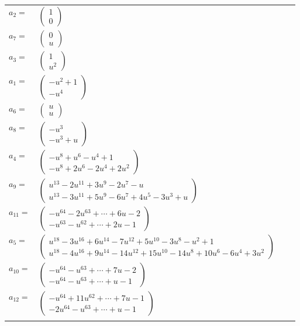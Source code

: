 \documentclass[1p]{elsarticle_modified}
\theoremstyle{definition}
\begin{document}
\begin{tabular}{m{7pt} m{180pt} m{7pt} m{180pt} }
\flushright $a_{2}=$&$\begin{pmatrix}1\\0\end{pmatrix}$ \\
\flushright $a_{7}=$&$\begin{pmatrix}0\\u\end{pmatrix}$ \\
\flushright $a_{3}=$&$\begin{pmatrix}1\\u^2\end{pmatrix}$ \\
\flushright $a_{1}=$&$\begin{pmatrix}- u^2+1\\- u^4\end{pmatrix}$ \\
\flushright $a_{6}=$&$\begin{pmatrix}u\\u\end{pmatrix}$ \\
\flushright $a_{8}=$&$\begin{pmatrix}- u^3\\- u^3+u\end{pmatrix}$ \\
\flushright $a_{4}=$&$\begin{pmatrix}- u^8+u^6- u^4+1\\- u^8+2 u^6-2 u^4+2 u^2\end{pmatrix}$ \\
\flushright $a_{9}=$&$\begin{pmatrix}u^{13}-2 u^{11}+3 u^9-2 u^7- u\\u^{13}-3 u^{11}+5 u^9-6 u^7+4 u^5-3 u^3+u\end{pmatrix}$ \\
\flushright $a_{11}=$&$\begin{pmatrix}- u^{64}-2 u^{63}+\cdots+6 u-2\\- u^{63}- u^{62}+\cdots+2 u-1\end{pmatrix}$ \\
\flushright $a_{5}=$&$\begin{pmatrix}u^{18}-3 u^{16}+6 u^{14}-7 u^{12}+5 u^{10}-3 u^8- u^2+1\\u^{18}-4 u^{16}+9 u^{14}-14 u^{12}+15 u^{10}-14 u^8+10 u^6-6 u^4+3 u^2\end{pmatrix}$ \\
\flushright $a_{10}=$&$\begin{pmatrix}- u^{64}- u^{63}+\cdots+7 u-2\\- u^{64}- u^{63}+\cdots+u-1\end{pmatrix}$ \\
\flushright $a_{12}=$&$\begin{pmatrix}- u^{64}+11 u^{62}+\cdots+7 u-1\\-2 u^{64}- u^{63}+\cdots+u-1\end{pmatrix}$\\&\end{tabular}
\end{document}
